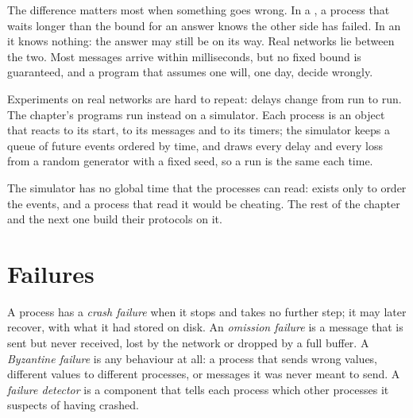 The difference matters most when something goes wrong. In a , a process that waits longer than the bound for an answer knows the other side has failed. In an  it knows nothing: the answer may still be on its way. Real networks lie between the two. Most messages arrive within milliseconds, but no fixed bound is guaranteed, and a program that assumes one will, one day, decide wrongly.

Experiments on real networks are hard to repeat: delays change from run to run. The chapter's programs run instead on a simulator. Each process is an object that reacts to its start, to its messages and to its timers; the simulator keeps a queue of future events ordered by time, and draws every delay and every loss from a random generator with a fixed seed, so a run is the same each time.

\label{lst:b3:distributed-systems:send}

\label{lst:b3:distributed-systems:run}

The simulator has no global time that the processes can read:  exists only to order the events, and a process that read it would be cheating. The rest of the chapter and the next one build their protocols on it.

\section{Failures}\label{sec:b3:distributed-systems:failures}

\begin{definition}\label{def:b3:distributed-systems:failures}
A process has a \emph{crash failure} when it stops and takes no further step; it may later recover, with what it had stored on disk. An \emph{omission failure} is a message that is sent but never received, lost by the network or dropped by a full buffer. A \emph{Byzantine failure} is any behaviour at all: a process that sends wrong values, different values to different processes, or messages it was never meant to send. A \emph{failure detector} is a component that tells each process which other processes it suspects of having crashed.
\end{definition}

